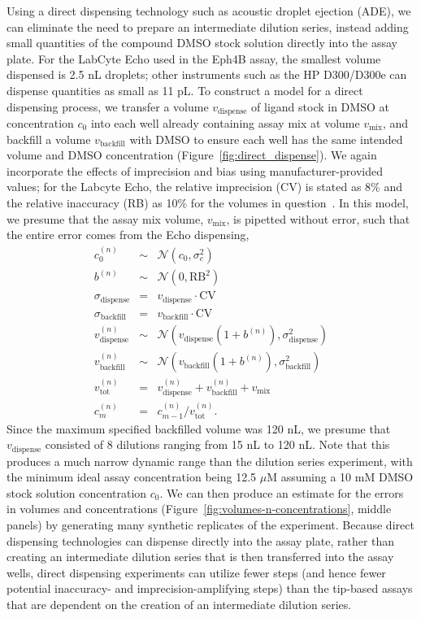 \documentclass[aps,pre,twocolumn,nofootinbib,superscriptaddress,linenumbers]{revtex4-1}
\begin{document}
Using a direct dispensing technology such as acoustic droplet ejection (ADE), we can eliminate the need to prepare an intermediate dilution series, instead adding small quantities of the compound DMSO stock solution directly into the assay plate.
For the LabCyte Echo used in the Eph4B assay, the smallest volume dispensed is 2.5 nL droplets; other instruments such as the HP D300/D300e can dispense quantities as small as 11 pL.
To construct a model for a direct dispensing process, we transfer a volume $v_\mathrm{dispense}$ of ligand stock in DMSO at concentration $c_0$ into each well already containing assay mix at volume $v_\mathrm{mix}$, and backfill a volume $v_\mathrm{backfill}$ with DMSO to ensure each well has the same intended volume and DMSO concentration (Figure~\ref{fig:direct_dispense}). 
We again incorporate the effects of imprecision and bias using manufacturer-provided values;
for the Labcyte Echo, the relative imprecision (CV) is stated as 8\% and the relative inaccuracy (RB) as 10\% for the volumes in question~\cite{_echo_2011}.
In this model, we presume that the assay mix volume, $v_\mathrm{mix}$, is pipetted without error, such that the entire error comes from the Echo dispensing,
\begin{eqnarray}
c_0^{(n)} &\sim& \mathcal{N}(c_0, \sigma_c^2) \nonumber \label{equation:stock-concentration-uncertainty-simple} \\
b^{(n)} &\sim& \mathcal{N}(0, \mathrm{RB}^2) \nonumber \\
\sigma_\mathrm{dispense} &=& v_\mathrm{dispense} \cdot \mathrm{CV} \nonumber \\
\sigma_\mathrm{backfill} &=& v_\mathrm{backfill} \cdot \mathrm{CV} \nonumber \\
v_\mathrm{dispense}^{(n)} &\sim& \mathcal{N}(v_\mathrm{dispense} (1 + b^{(n)}) , \sigma_\mathrm{dispense}^2) \nonumber \\
v_\mathrm{backfill}^{(n)} &\sim& \mathcal{N}(v_\mathrm{backfill} (1 + b^{(n)}), \sigma_\mathrm{backfill}^2) \nonumber \\
v_\mathrm{tot}^{(n)} &=& v_\mathrm{dispense}^{(n)} + v_\mathrm{backfill}^{(n)} + v_\mathrm{mix} \nonumber \\
c_m^{(n)} &=& c_{m-1}^{(n)} / v_\mathrm{tot}^{(n)} .
\end{eqnarray}
Since the maximum specified backfilled volume was 120 nL, we presume that $v_\mathrm{dispense}$ consisted of 8 dilutions ranging from 15 nL to 120 nL. 
Note that this produces a much narrow dynamic range than the dilution series experiment, with the minimum ideal assay concentration being 12.5 $\mu$M assuming a 10 mM DMSO stock solution concentration $c_0$.
We can then produce an estimate for the errors in volumes and concentrations (Figure~\ref{fig:volumes-n-concentrations}, middle panels) by generating many synthetic replicates of the experiment.
Because direct dispensing technologies can dispense directly into the assay plate, rather than creating an intermediate dilution series that is then transferred into the assay wells, direct dispensing experiments can utilize fewer steps (and hence fewer potential inaccuracy- and imprecision-amplifying steps) than the tip-based assays that are dependent on the creation of an intermediate dilution series.
\end{document}
